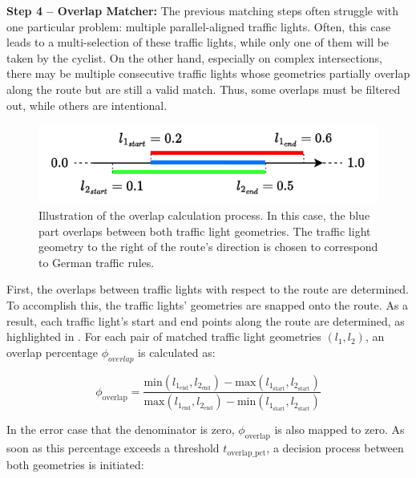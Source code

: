\textbf{\color{cidarkblue}Step 4 -- Overlap Matcher:} The previous matching steps often struggle with one particular problem: multiple parallel-aligned traffic lights. Often, this case leads to a multi-selection of these traffic lights, while only one of them will be taken by the cyclist. On the other hand, especially on complex intersections, there may be multiple consecutive traffic lights whose geometries partially overlap along the route but are still a valid match. Thus, some overlaps must be filtered out, while others are intentional.

\begin{figure}[b]
\centering
\includegraphics[width=0.5\linewidth]{images/overlap.drawio.pdf}
\caption{Illustration of the overlap calculation process. In this case, the blue part overlaps between both traffic light geometries. The traffic light geometry to the right of the route's direction is chosen to correspond to German traffic rules.}
\label{fig:sg-matching-overlap-filter}
\end{figure}

First, the overlaps between traffic lights with respect to the route are determined. To accomplish this, the traffic lights' geometries are snapped onto the route. As a result, each traffic light's start and end points along the route are determined, as highlighted in . For each pair of matched traffic light geometries $(l_1, l_2)$, an overlap percentage $\phi_{overlap}$ is calculated as:

\begin{equation}
    \phi_{\text{overlap}} = \frac{\text{min}(l_{1_{\text{end}}}, l_{2_{\text{end}}}) - \text{max}(l_{1_{\text{start}}}, l_{2_{\text{start}}})}{\text{max}(l_{1_{\text{end}}}, l_{2_{\text{end}}}) - \text{min}(l_{1_{\text{start}}}, l_{2_{\text{start}}})}
\end{equation}

In the error case that the denominator is zero, $\phi_{\text{overlap}}$ is also mapped to zero. As soon as this percentage exceeds a threshold $t_{\text{overlap\_pct}}$, a decision process between both geometries is initiated:

